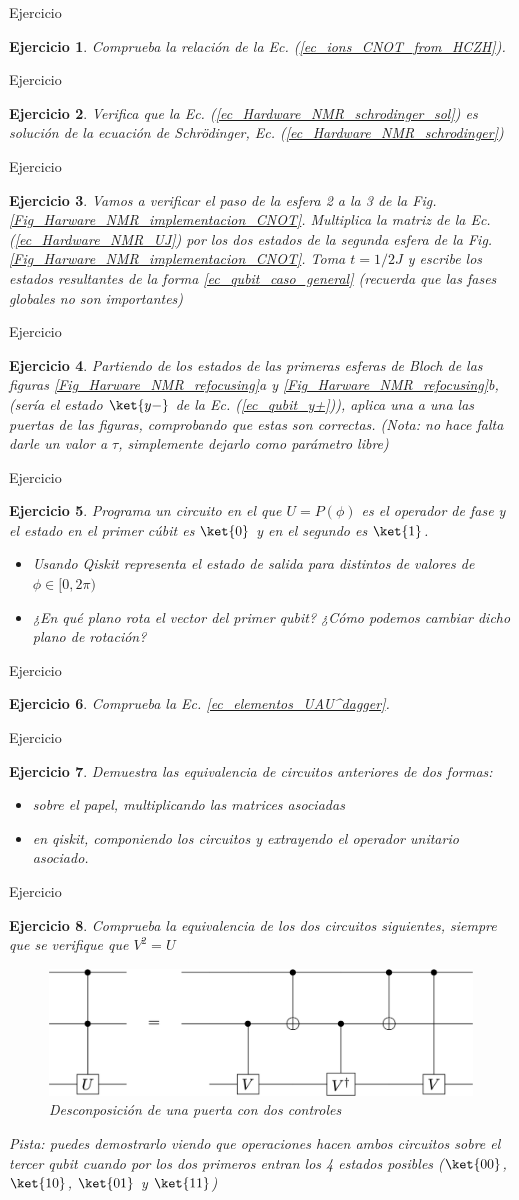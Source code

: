 \documentclass[a4paper,11pt]{book} %
\newtheorem{ejercicio_contador}{Ejercicio}
\newcommand{\Ejercicio}[1]{
		\begin{mybox_gray}{Ejercicio} 
			\begin{ejercicio_contador}
				 #1 
			\end{ejercicio_contador} 
		\end{mybox_gray}
	}
\numberwithin{equation}{chapter}
\begin{document}
\Ejercicio{
Comprueba la relación de la Ec. (\ref{ec_ions_CNOT_from_HCZH}).
}

\Ejercicio{
Verifica que la Ec. (\ref{ec_Hardware_NMR_schrodinger_sol}) es solución de la ecuación de Schrödinger, Ec. (\ref{ec_Hardware_NMR_schrodinger})
}

\Ejercicio{
Vamos a verificar el paso de la esfera 2 a la 3 de la Fig. \ref{Fig_Harware_NMR_implementacion_CNOT}. Multiplica la matriz de la Ec. (\ref{ec_Hardware_NMR_UJ}) por los dos estados de la segunda esfera de la Fig. \ref{Fig_Harware_NMR_implementacion_CNOT}. Toma $t=1/2J$ y escribe los estados resultantes de la forma \ref{ec_qubit_caso_general} (recuerda que las fases globales no son importantes)
}

\Ejercicio{
Partiendo de los estados de las primeras esferas de Bloch de las figuras  \ref{Fig_Harware_NMR_refocusing}a y \ref{Fig_Harware_NMR_refocusing}b, (sería el estado $\ket{y-}$ de la Ec.    (\ref{ec_qubit_y+})), aplica una a una las puertas de las figuras, comprobando que estas son correctas. (Nota: no hace falta darle un valor a $\tau$, simplemente dejarlo como parámetro libre)
}

\Ejercicio{
Programa un circuito en el que  $U = P(\phi)$ es el operador de fase y el estado en el primer cúbit es $\ket{0}$ y en el segundo es $\ket{1}$.
\begin{itemize}
\item[a)] Usando Qiskit representa el estado de salida para distintos de valores de $\phi \in [0, 2 \pi )$


\item[b)] ¿En qué plano rota el vector del primer qubit? ¿Cómo podemos cambiar dicho plano de rotación?
\end{itemize}
}

\Ejercicio{
Comprueba la Ec. \ref{ec_elementos_UAU^dagger}.
}

\Ejercicio{
Demuestra las equivalencia de circuitos anteriores de dos formas:
\begin{itemize}
\item[a)] sobre el papel,  multiplicando las matrices asociadas
\item[b)] en qiskit, componiendo los circuitos y extrayendo el operador unitario asociado.
\end{itemize}
}

\Ejercicio{
Comprueba la equivalencia de los dos circuitos siguientes, siempre que se verifique que $V^2 = U$
\begin{figure}[H]
\centering
\includegraphics[width=0.60\linewidth]{Figuras/Fig_elementos_CCUdecomposition.png}
\caption{Desconposición de una puerta con dos controles}
\label{Fig_elementos_CCUdecomposition}
\end{figure}
Pista: puedes demostrarlo viendo que operaciones hacen ambos circuitos sobre el tercer qubit cuando por los dos
primeros entran los 4 estados posibles ($\ket{00}$, $\ket{10}$, $\ket{01}$ y $\ket{11}$)
}
\end{document}
